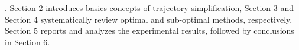 . Section 2 introduces basics concepts of trajectory simplification,
Section 3 and Section 4 systematically review optimal and sub-optimal \lsa methods, respectively,
Section 5 reports and analyzes the experimental results, followed by
conclusions in Section 6.




